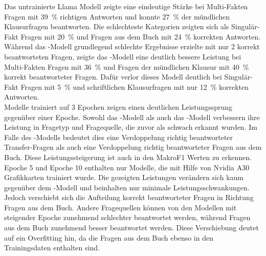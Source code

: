 Das untrainierte Llama Modell zeigte eine eindeutige Stärke bei Multi-Fakten Fragen mit \SI{39}{\percent} richtigen Antworten und konnte \SI{27}{\percent} der mündlichen Klausurfragen beantworten.
Die schlechteste Kategorien zeigten sich als Singulär-Fakt Fragen mit \SI{20}{\percent} und Fragen aus dem Buch mit \SI{24}{\percent} korrekten Antworten.\\

Während das \liv-Modell grundlegend schlechte Ergebnisse erzielte mit nur 2 korrekt beantworteten Fragen,
zeigte das \lia-Modell eine deutlich bessere Leistung bei Multi-Fakten Fragen mit \SI{36}{\percent}
und Fragen der mündlichen Klausur mit \SI{40}{\percent} korrekt beantworteter Fragen.
Dafür verlor dieses Modell deutlich bei Singulär-Fakt Fragen mit \SI{5}{\percent} und schriftlichen Klausurfragen mit nur \SI{12}{\percent} korrekten Antworten.\\

Modelle trainiert auf 3 Epochen zeigen einen deutlichen Leistungssprung gegenüber einer Epoche.
Sowohl das \lev-Modell als auch das \lea-Modell verbessern ihre Leistung in Fragetyp und Fragequelle, die zuvor als schwach erkannt wurden.
Im Falle des \lea-Modells bedeutet dies eine Verdoppelung richtig beantworteter Transfer-Fragen als auch eine Verdoppelung richtig beantworteter Fragen aus dem Buch.
Diese Leistungssteigerung ist auch in den MakroF1 Werten zu erkennen.\\

Epoche 5 und Epoche 10 enthalten nur Modelle, die mit Hilfe von Nvidia A30 Grafikkarten trainiert wurde.
Die gezeigten Leistungen verändern sich kaum gegenüber dem \lea-Modell und beinhalten nur minimale Leistungsschwankungen.
Jedoch verschiebt sich die Aufteilung korrekt beantworteter Fragen in Richtung Fragen aus dem Buch.
Andere Fragequellen können von den Modellen mit steigender Epoche zunehmend schlechter beantwortet werden, während Fragen aus dem Buch zunehmend besser beantwortet werden.
Diese Verschiebung deutet auf ein Overfitting hin, da die Fragen aus dem Buch ebenso in den Trainingsdaten enthalten sind.\\

